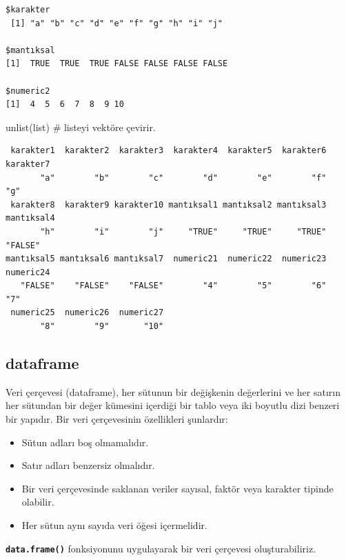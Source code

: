 \documentclass[
  letterpaper,
  DIV=11,
  numbers=noendperiod]{scrreprt}
\newenvironment{Shaded}{\begin{snugshade}}{\end{snugshade}}
\newcommand{\CommentTok}[1]{\textcolor[rgb]{0.37,0.37,0.37}{#1}}
\newcommand{\FunctionTok}[1]{\textcolor[rgb]{0.28,0.35,0.67}{#1}}
\newcommand{\NormalTok}[1]{\textcolor[rgb]{0.00,0.23,0.31}{#1}}
\begin{document}
\begin{verbatim}
$karakter
 [1] "a" "b" "c" "d" "e" "f" "g" "h" "i" "j"

$mantıksal
[1]  TRUE  TRUE  TRUE FALSE FALSE FALSE FALSE

$numeric2
[1]  4  5  6  7  8  9 10
\end{verbatim}

\begin{Shaded}
\begin{Highlighting}[]
\FunctionTok{unlist}\NormalTok{(list) }\CommentTok{\# listeyi vektöre çevirir.}
\end{Highlighting}
\end{Shaded}

\begin{verbatim}
 karakter1  karakter2  karakter3  karakter4  karakter5  karakter6  karakter7 
       "a"        "b"        "c"        "d"        "e"        "f"        "g" 
 karakter8  karakter9 karakter10 mantıksal1 mantıksal2 mantıksal3 mantıksal4 
       "h"        "i"        "j"     "TRUE"     "TRUE"     "TRUE"    "FALSE" 
mantıksal5 mantıksal6 mantıksal7  numeric21  numeric22  numeric23  numeric24 
   "FALSE"    "FALSE"    "FALSE"        "4"        "5"        "6"        "7" 
 numeric25  numeric26  numeric27 
       "8"        "9"       "10" 
\end{verbatim}

\hypertarget{dataframe}{%
\subsection{dataframe}\label{dataframe}}

Veri çerçevesi (dataframe), her sütunun bir değişkenin değerlerini ve
her satırın her sütundan bir değer kümesini içerdiği bir tablo veya iki
boyutlu dizi benzeri bir yapıdır. Bir veri çerçevesinin özellikleri
şunlardır:

\begin{itemize}
\item
  Sütun adları boş olmamalıdır.
\item
  Satır adları benzersiz olmalıdır.
\item
  Bir veri çerçevesinde saklanan veriler sayısal, faktör veya karakter
  tipinde olabilir.
\item
  Her sütun aynı sayıda veri öğesi içermelidir.
\end{itemize}

\textbf{\texttt{data.frame()}} fonksiyonunu uygulayarak bir veri
çerçevesi oluşturabiliriz.
\end{document}
